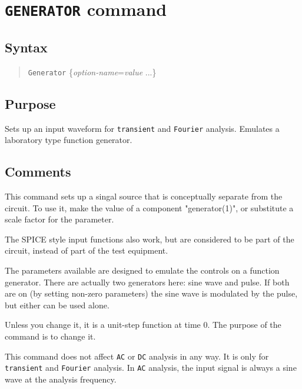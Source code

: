 \section{{\tt GENERATOR} command}
\subsection{Syntax}
\begin{verse}
{\tt Generator} \{{\it option-name}={\it value} ...\}
\end{verse}
\subsection{Purpose}

Sets up an input waveform for {\tt transient} and {\tt Fourier} analysis.
Emulates a laboratory type function generator.
\subsection{Comments}

This command sets up a singal source that is conceptually separate
from the circuit.  To use it, make the value of a component
"generator(1)", or substitute a scale factor for the parameter.

The SPICE style input functions also work, but are considered to
be part of the circuit, instead of part of the test equipment.

The parameters available are designed to emulate the controls on a function
generator.  There are actually two generators here: sine wave and pulse.  If
both are on (by setting non-zero parameters) the sine wave is modulated by
the pulse, but either can be used alone.

Unless you change it, it is a unit-step function at time 0.  The purpose of
the command is to change it.

This command does not affect {\tt AC} or {\tt DC} analysis in any way.  It
is only for {\tt transient} and {\tt Fourier} analysis.  In {\tt AC}
analysis, the input signal is always a sine wave at the analysis frequency.

